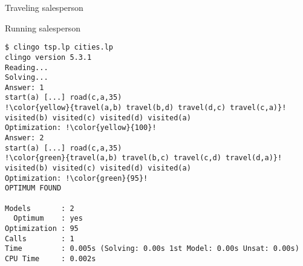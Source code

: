 \begin{frame}{Traveling salesperson}
\only<3->{}
%
%
%
%
\end{frame}
\begin{frame}{Running salesperson}
\begin{lstlisting}[escapechar=!]
$ clingo tsp.lp cities.lp
clingo version 5.3.1
Reading...
Solving...
Answer: 1
start(a) [...] road(c,a,35)
!\color{yellow}{travel(a,b) travel(b,d) travel(d,c) travel(c,a)}!
visited(b) visited(c) visited(d) visited(a)
Optimization: !\color{yellow}{100}!
Answer: 2
start(a) [...] road(c,a,35)
!\color{green}{travel(a,b) travel(b,c) travel(c,d) travel(d,a)}!
visited(b) visited(c) visited(d) visited(a)
Optimization: !\color{green}{95}!
OPTIMUM FOUND

Models       : 2
  Optimum    : yes
Optimization : 95
Calls        : 1
Time         : 0.005s (Solving: 0.00s 1st Model: 0.00s Unsat: 0.00s)
CPU Time     : 0.002s
\end{lstlisting}
\end{frame}
%
